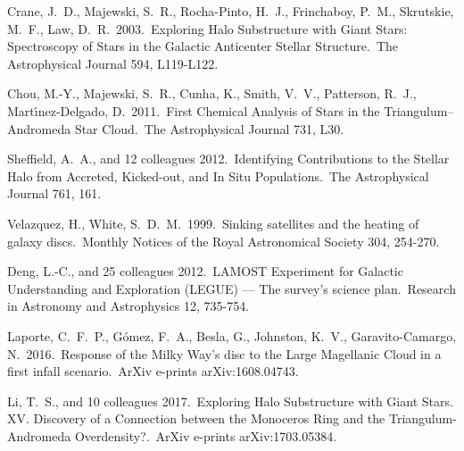 \begin{thebibliography}{-------}
 Crane, J.~D., Majewski, S.~R., Rocha-Pinto, H.~J., Frinchaboy, P.~M., Skrutskie, M.~F., Law, D.~R.\ 2003.\ Exploring Halo Substructure with Giant Stars: Spectroscopy of Stars in the Galactic Anticenter Stellar Structure.\ The Astrophysical Journal 594, L119-L122. 

 Chou, M.-Y., Majewski, S.~R., Cunha, K., Smith, V.~V., Patterson, R.~J., Mart{\'{\i}}nez-Delgado, D.\ 2011.\ First Chemical Analysis of Stars in the Triangulum--Andromeda Star Cloud.\ The Astrophysical Journal 731, L30. 

 Sheffield, A.~A., and 12 colleagues 2012.\ Identifying Contributions to the Stellar Halo from Accreted, Kicked-out, and In Situ Populations.\ The Astrophysical Journal 761, 161. 

 Velazquez, H., White, S.~D.~M.\ 1999.\ Sinking satellites and the heating of galaxy discs.\ Monthly Notices of the Royal Astronomical Society 304, 254-270. 


 Deng, L.-C., and 25 colleagues 2012.\ LAMOST Experiment for Galactic Understanding and Exploration (LEGUE) {---} The survey's science plan.\ Research in Astronomy and Astrophysics 12, 735-754. 

 Laporte, C.~F.~P., G{\'o}mez, F.~A., Besla, G., Johnston, K.~V., Garavito-Camargo, N.\ 2016.\ Response of the Milky Way's disc to the Large Magellanic Cloud in a first infall scenario.\ ArXiv e-prints arXiv:1608.04743. 

 Li, T.~S., and 10 colleagues 2017.\ Exploring Halo Substructure with Giant Stars. XV. Discovery of a Connection between the Monoceros Ring and the Triangulum-Andromeda Overdensity?.\ ArXiv e-prints arXiv:1703.05384. 

\end{thebibliography}
